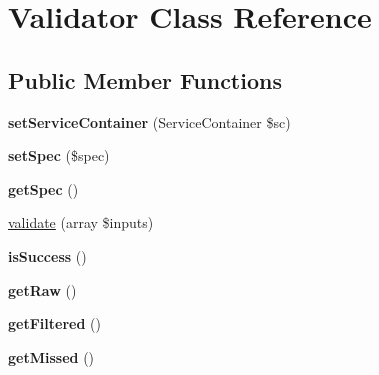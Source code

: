 \hypertarget{class_utopia_1_1_components_1_1_validator_1_1_validator}{
\section{Validator Class Reference}
\label{class_utopia_1_1_components_1_1_validator_1_1_validator}
}
\subsection*{Public Member Functions}
\begin{DoxyCompactItemize}
\item 
\hypertarget{class_utopia_1_1_components_1_1_validator_1_1_validator_a1005d56ba1d200dceba1d7abc9d29024}{
{\bfseries setServiceContainer} (ServiceContainer \$sc)}
\label{class_utopia_1_1_components_1_1_validator_1_1_validator_a1005d56ba1d200dceba1d7abc9d29024}

\item 
\hypertarget{class_utopia_1_1_components_1_1_validator_1_1_validator_ab1efd71e6ac373b9f00f5c0dcbea4d86}{
{\bfseries setSpec} (\$spec)}
\label{class_utopia_1_1_components_1_1_validator_1_1_validator_ab1efd71e6ac373b9f00f5c0dcbea4d86}

\item 
\hypertarget{class_utopia_1_1_components_1_1_validator_1_1_validator_af40e2e26be7027ab900dba69e02a1e43}{
{\bfseries getSpec} ()}
\label{class_utopia_1_1_components_1_1_validator_1_1_validator_af40e2e26be7027ab900dba69e02a1e43}

\item 
\hyperlink{class_utopia_1_1_components_1_1_validator_1_1_validator_a54a539a85236b68c77757a1f09739ad6}{validate} (array \$inputs)
\item 
\hypertarget{class_utopia_1_1_components_1_1_validator_1_1_validator_a619873d6cfe310657ba866caebd9b62b}{
{\bfseries isSuccess} ()}
\label{class_utopia_1_1_components_1_1_validator_1_1_validator_a619873d6cfe310657ba866caebd9b62b}

\item 
\hypertarget{class_utopia_1_1_components_1_1_validator_1_1_validator_ae598234da4560be555092b991ab94cd1}{
{\bfseries getRaw} ()}
\label{class_utopia_1_1_components_1_1_validator_1_1_validator_ae598234da4560be555092b991ab94cd1}

\item 
\hypertarget{class_utopia_1_1_components_1_1_validator_1_1_validator_ad4de1efc00526a434c9de8a1664eb77c}{
{\bfseries getFiltered} ()}
\label{class_utopia_1_1_components_1_1_validator_1_1_validator_ad4de1efc00526a434c9de8a1664eb77c}

\item 
\hypertarget{class_utopia_1_1_components_1_1_validator_1_1_validator_a07c9daf68df79eb1e995bf373ae978fa}{
{\bfseries getMissed} ()}
\label{class_utopia_1_1_components_1_1_validator_1_1_validator_a07c9daf68df79eb1e995bf373ae978fa}

\end{DoxyCompactItemize}


